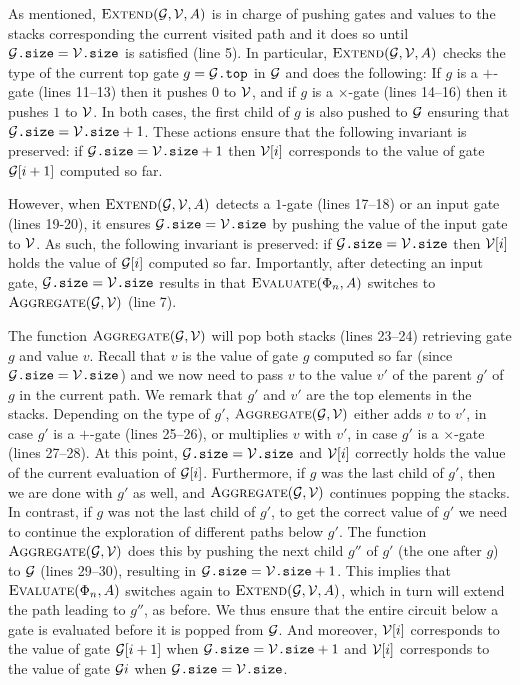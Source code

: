 As mentioned,  $\textsc{Extend}(\mathcal{G},\mathcal{V},A)$ is in charge of pushing gates and values to the stacks corresponding the current visited path and it does so until $\mathcal{G}\texttt{.size} = \mathcal{V}\texttt{.size}$ is satisfied (line 5). In particular,
$\textsc{Extend}(\mathcal{G},\mathcal{V},A)$ checks the type of the current top gate $g=\mathcal{G}\texttt{.top}$ in $\mathcal{G}$ and does the following:
If $g$ is a $+$-gate (lines 11--13) then it pushes $0$ to $\mathcal{V}$, and if $g$ is a $\times$-gate (lines 14--16) then it pushes $1$ to $\mathcal{V}$.
In both cases, the first child of $g$ is also pushed to $\mathcal{G}$ ensuring that $\mathcal{G}\texttt{.size} = \mathcal{V}\texttt{.size}+1$. These actions ensure that
the following invariant is preserved: if $\mathcal{G}\texttt{.size} = \mathcal{V}\texttt{.size}+1$ then
$\mathcal{V}[i]$ corresponds to the value of gate $\mathcal{G}[i+1]$ computed so far.

However, when $\textsc{Extend}(\mathcal{G},\mathcal{V},A)$ detects a $1$-gate (lines 17--18) or an input gate (lines 19-20), it ensures  $\mathcal{G}\texttt{.size} = \mathcal{V}\texttt{.size}$
by pushing the value of the input gate to $\mathcal{V}$. As such, the following invariant is preserved: if  $\mathcal{G}\texttt{.size} = \mathcal{V}\texttt{.size}$ then  $\mathcal{V}[i]$ holds the value of $\mathcal{G}[i]$ computed so far. Importantly, after detecting an input gate, $\mathcal{G}\texttt{.size} = \mathcal{V}\texttt{.size}$ results in that $\textsc{Evaluate}(\Phi_n,A)$ switches to $\textsc{Aggregate}(\mathcal{G},\mathcal{V})$ (line 7). 

The function $\textsc{Aggregate}(\mathcal{G},\mathcal{V})$ 
will pop both stacks (lines 23--24) retrieving gate $g$ and value $v$. Recall that $v$ is the value of gate $g$ computed so far (since  $\mathcal{G}\texttt{.size} = \mathcal{V}\texttt{.size}$) and we now need to pass $v$ to the value $v'$ of the parent  $g'$ of $g$ in the current path. We remark that $g'$ and $v'$  are  the top elements in the stacks.
Depending on the type of $g'$, $\textsc{Aggregate}(\mathcal{G},\mathcal{V})$ either adds $v$ to $v'$, in case $g'$ is a $+$-gate (lines 25--26), or multiplies $v$ with $v'$, in case $g'$ is a $\times$-gate (lines 27--28). At this point,
$\mathcal{G}\texttt{.size} = \mathcal{V}\texttt{.size}$ and $\mathcal{V}[i]$ correctly holds the value of the current evaluation of $\mathcal{G}[i]$. Furthermore, if $g$ was the last child
of $g'$, then we are done with $g'$ as well, and $\textsc{Aggregate}(\mathcal{G},\mathcal{V})$ continues popping the stacks. 
In contrast,
if $g$ was not the last child of $g'$, to get the correct value of $g'$ we need to continue the exploration of different paths 
below $g'$. The function $\textsc{Aggregate}(\mathcal{G},\mathcal{V})$ does this by pushing the next child $g''$ of $g'$ (the one after $g$) to $\mathcal{G}$ (lines 29--30), resulting in $\mathcal{G}\texttt{.size} = \mathcal{V}\texttt{.size}+1$. This implies that $\textsc{Evaluate}(\Phi_n,A)$ switches again to $\textsc{Extend}(\mathcal{G},\mathcal{V},A)$, which in turn will extend the path leading to $g''$, as before. We thus ensure
that the entire circuit below a gate is evaluated before it is popped from $\mathcal{G}$. And moreover, $\mathcal{V}[i]$ corresponds to the value of gate $\mathcal{G}[i+1]$ when $\mathcal{G}\texttt{.size} = \mathcal{V}\texttt{.size}+1$ and $\mathcal{V}[i]$ corresponds to the value of gate $\mathcal{G}{i}$ when
 $\mathcal{G}\texttt{.size} = \mathcal{V}\texttt{.size}$. 
 
